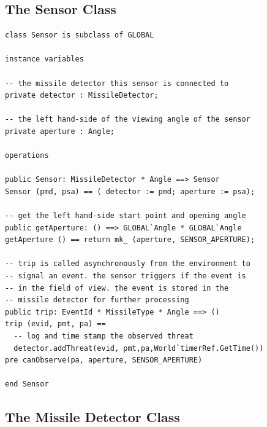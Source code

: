 \documentclass{overturerepchap}
\begin{document}
\subsection{The Sensor Class}

\begin{lstlisting}
class Sensor is subclass of GLOBAL

instance variables

-- the missile detector this sensor is connected to
private detector : MissileDetector;

-- the left hand-side of the viewing angle of the sensor
private aperture : Angle;

operations

public Sensor: MissileDetector * Angle ==> Sensor
Sensor (pmd, psa) == ( detector := pmd; aperture := psa);

-- get the left hand-side start point and opening angle
public getAperture: () ==> GLOBAL`Angle * GLOBAL`Angle
getAperture () == return mk_ (aperture, SENSOR_APERTURE);

-- trip is called asynchronously from the environment to
-- signal an event. the sensor triggers if the event is
-- in the field of view. the event is stored in the
-- missile detector for further processing
public trip: EventId * MissileType * Angle ==> ()
trip (evid, pmt, pa) ==
  -- log and time stamp the observed threat
  detector.addThreat(evid, pmt,pa,World`timerRef.GetTime())
pre canObserve(pa, aperture, SENSOR_APERTURE)

end Sensor
\end{lstlisting}

\subsection{The Missile Detector Class}
\end{document}
